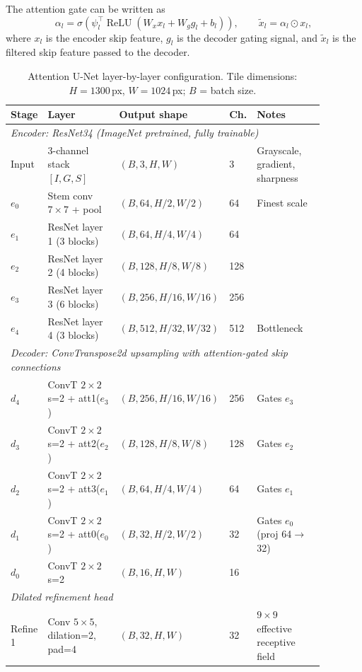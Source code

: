 \documentclass[11pt,letterpaper]{article}
\begin{document}
The attention gate can be written as
\begin{equation}
\alpha_l = \sigma\left(\psi_l^\top \operatorname{ReLU}(W_x x_l + W_g g_l + b_l)\right), \qquad \tilde{x}_l = \alpha_l \odot x_l,
\end{equation}
where $x_l$ is the encoder skip feature, $g_l$ is the decoder gating signal, and $\tilde{x}_l$ is the filtered skip feature passed to the decoder.

\begin{table}[htbp]
\centering
\caption{Attention U-Net layer-by-layer configuration. Tile dimensions: $H=1300$\,px, $W=1024$\,px; $B$ = batch size.}
\begin{tabular}{p{0.07\linewidth}p{0.28\linewidth}p{0.20\linewidth}p{0.07\linewidth}p{0.26\linewidth}}
\toprule
Stage & Layer & Output shape & Ch. & Notes \\
\midrule
\multicolumn{5}{l}{\textit{Encoder: ResNet34 (ImageNet pretrained, fully trainable)}} \\
Input & 3-channel stack $[I,G,S]$ & $(B,3,H,W)$ & 3 & Grayscale, gradient, sharpness \\
$e_0$ & Stem conv $7{\times}7$ + pool & $(B,64,H/2,W/2)$ & 64 & Finest scale \\
$e_1$ & ResNet layer 1 (3 blocks) & $(B,64,H/4,W/4)$ & 64 & \\
$e_2$ & ResNet layer 2 (4 blocks) & $(B,128,H/8,W/8)$ & 128 & \\
$e_3$ & ResNet layer 3 (6 blocks) & $(B,256,H/16,W/16)$ & 256 & \\
$e_4$ & ResNet layer 4 (3 blocks) & $(B,512,H/32,W/32)$ & 512 & Bottleneck \\
\midrule
\multicolumn{5}{l}{\textit{Decoder: ConvTranspose2d upsampling with attention-gated skip connections}} \\
$d_4$ & ConvT $2{\times}2$ s=2 + att1($e_3$) & $(B,256,H/16,W/16)$ & 256 & Gates $e_3$ \\
$d_3$ & ConvT $2{\times}2$ s=2 + att2($e_2$) & $(B,128,H/8,W/8)$ & 128 & Gates $e_2$ \\
$d_2$ & ConvT $2{\times}2$ s=2 + att3($e_1$) & $(B,64,H/4,W/4)$ & 64 & Gates $e_1$ \\
$d_1$ & ConvT $2{\times}2$ s=2 + att0($e_0$) & $(B,32,H/2,W/2)$ & 32 & Gates $e_0$ (proj 64$\to$32) \\
$d_0$ & ConvT $2{\times}2$ s=2 & $(B,16,H,W)$ & 16 & \\
\midrule
\multicolumn{5}{l}{\textit{Dilated refinement head}} \\
Refine 1 & Conv $5{\times}5$, dilation=2, pad=4 & $(B,32,H,W)$ & 32 & $9{\times}9$ effective receptive field \\

\end{tabular}
\end{table}
\end{document}
